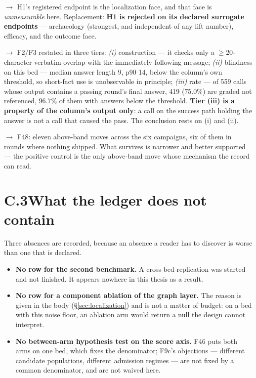 \begin{description}[leftmargin=0pt,style=nextline,font=\normalfont,itemsep=5pt]
\item[``H1 is falsified'', unqualified] $\to$ H1's registered endpoint is
the localization face, and that face is \emph{unmeasurable} here.
Replacement: \textbf{H1 is rejected on its declared surrogate endpoints}
--- archaeology (strongest, and independent of any lift number), efficacy,
and the outcome face.

\item[``The evidence column has a 75\% false-negative rate'',
      with the implication that those calls mattered] $\to$ F2/F3 restated
in three tiers: \emph{(i)} construction --- it checks only a
$\ge 20$-character verbatim overlap with the immediately following message;
\emph{(ii)} blindness on this bed --- median answer length 9, p90 14, below
the column's own threshold, so short-fact use is unobservable in principle;
\emph{(iii)} rate --- of 559 calls whose output contains a passing round's
final answer, 419 ($75.0\%$) are graded not referenced, $96.7\%$ of them
with answers below the threshold. \textbf{Tier (iii) is a property of the
column's output only}: a call on the success path holding the answer is
not a call that caused the pass. The conclusion rests on (i) and (ii).

\item[``The one ratchet click is the only above-band move''] $\to$ F48:
eleven above-band moves across the six campaigns, six of them in rounds
where nothing shipped. What survives is narrower and better supported ---
the positive control is the only above-band move whose mechanism the record
can read.

\end{description}

\section*{C.3\quad What the ledger does not contain}

Three absences are recorded, because an absence a reader has to discover is
worse than one that is declared.

\begin{itemize}
  \item \textbf{No row for the second benchmark.} A cross-bed replication
        was started and not finished. It appears nowhere in this thesis as
        a result.
  \item \textbf{No row for a component ablation of the graph layer.} The
        reason is given in the body (\S\ref{sec:localization}) and is not a
        matter of budget: on a bed with this noise floor, an ablation arm
        would return a null the design cannot interpret.
  \item \textbf{No between-arm hypothesis test on the score axis.} F46 puts
        both arms on one bed, which fixes the denominator; F9c's objections
        --- different candidate populations, different admission regimes
        --- are not fixed by a common denominator, and are not waived here.
\end{itemize}
